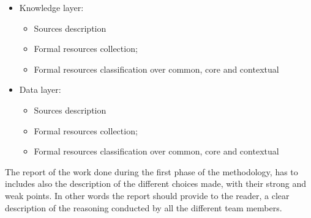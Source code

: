 \begin{itemize}
    \begin{itemize}
        \item Knowledge layer:
        \begin{itemize}
            \item Sources description
            \item Formal resources collection;
            \item Formal resources classification over common, core and contextual
        \end{itemize}
        \item Data layer:
        \begin{itemize}
            \item Sources description
            \item Formal resources collection;
            \item Formal resources classification over common, core and contextual
        \end{itemize}
    \end{itemize}
\end{itemize}


\noindent The report of the work done during the first phase of the methodology, has to includes also the description of the  different choices made, with their strong and weak points. In other words the report should provide to the reader, a clear description of the reasoning conducted by all the different team members.

